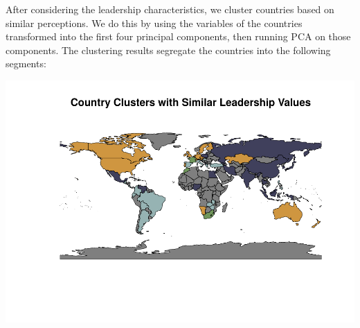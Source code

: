 \documentclass[
]{article}
\begin{document}
After considering the leadership characteristics, we cluster countries
based on similar perceptions. We do this by using the variables of the
countries transformed into the first four principal components, then
running PCA on those components. The clustering results segregate the
countries into the following segments:

\begin{center}\includegraphics[width=0.85\linewidth]{final_report_files/figure-latex/unnamed-chunk-5-1} \end{center}
\end{document}
